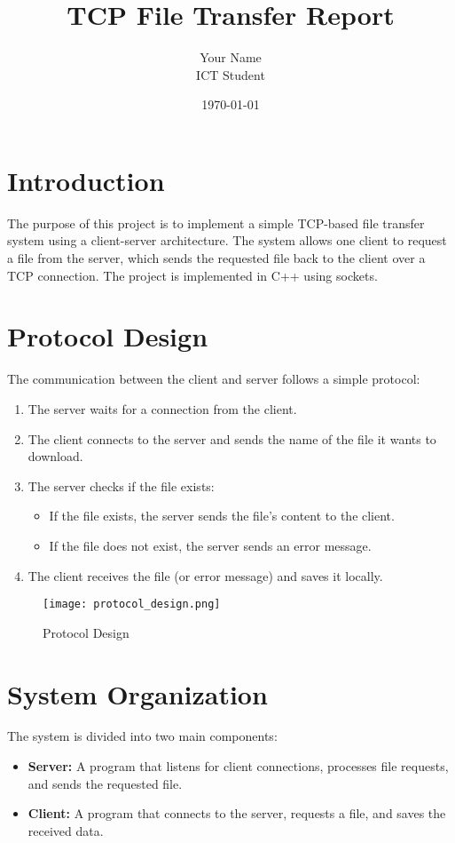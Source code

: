 \documentclass[a4paper,12pt]{article}
\title{TCP File Transfer Report}
\author{Your Name \\ ICT Student}
\date{\today}
\begin{document}
\maketitle

\section{Introduction}
The purpose of this project is to implement a simple TCP-based file transfer system using a client-server architecture. The system allows one client to request a file from the server, which sends the requested file back to the client over a TCP connection. The project is implemented in C++ using sockets.

\section{Protocol Design}
The communication between the client and server follows a simple protocol:
\begin{enumerate}
    \item The server waits for a connection from the client.
    \item The client connects to the server and sends the name of the file it wants to download.
    \item The server checks if the file exists:
    \begin{itemize}
        \item If the file exists, the server sends the file's content to the client.
        \item If the file does not exist, the server sends an error message.
    \end{itemize}
    \item The client receives the file (or error message) and saves it locally.
\end{enumerate}

\begin{figure}[h!]
    \centering
    \texttt{[image: protocol\_design.png]}
    \caption{Protocol Design}
    \label{fig:protocol}
\end{figure}

\section{System Organization}
The system is divided into two main components:
\begin{itemize}
    \item \textbf{Server:} A program that listens for client connections, processes file requests, and sends the requested file.
    \item \textbf{Client:} A program that connects to the server, requests a file, and saves the received data.
\end{itemize}
\end{document}
